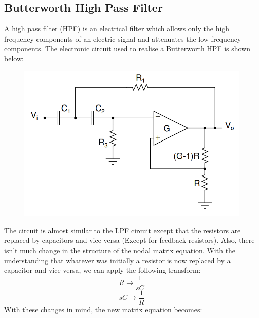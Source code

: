\documentclass[12pt, a4paper]{article}
\begin{document}
\subsection{Butterworth High Pass Filter}
A high pass filter (HPF) is an electrical filter which allows only the high frequency components of an electric signal and attenuates the low frequency components. The electronic circuit used to realise a Butterworth HPF is shown below:
\vspace*{-0.5cm}
\begin{figure}[H]
    \centering
    \includegraphics[scale = 0.8]{Figure_bhpf.png}
    \label{fig:sample}
\end{figure}
The circuit is almost similar to the LPF circuit except that the resistors are replaced by capacitors and vice-versa (Except for feedback resistors). Also, there isn't much change in the structure of the nodal matrix equation. With the understanding that whatever was initially a resistor is now replaced by a capacitor and vice-versa, we can apply the following transform:
\begin{equation*}
    R \rightarrow \frac{1}{sC}
\end{equation*}
\begin{equation*}
    sC \rightarrow \frac{1}{R}
\end{equation*}
With these changes in mind, the new matrix equation becomes:
\end{document}
